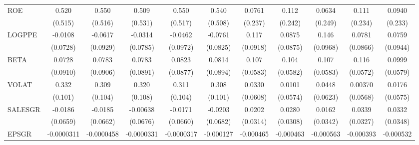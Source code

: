 \begin{table}[htbp]
\begin{tabular}{l*{10}{c}}
ROE             &    0.520         &    0.550         &    0.509         &    0.550         &    0.540         &   0.0761         &    0.112         &   0.0634         &    0.111         &   0.0940         \\
                &  (0.515)         &  (0.516)         &  (0.531)         &  (0.517)         &  (0.508)         &  (0.237)         &  (0.242)         &  (0.249)         &  (0.234)         &  (0.233)         \\
LOGPPE          &  -0.0108         &  -0.0617         &  -0.0314         &  -0.0462         &  -0.0761         &    0.117         &   0.0875         &    0.146         &   0.0781         &   0.0759         \\
                & (0.0728)         & (0.0929)         & (0.0785)         & (0.0972)         & (0.0825)         & (0.0918)         & (0.0875)         & (0.0968)         & (0.0866)         & (0.0944)         \\
BETA            &   0.0728         &   0.0783         &   0.0783         &   0.0823         &   0.0814         &    0.107\sym{*}  &    0.104\sym{*}  &    0.107\sym{*}  &    0.116\sym{**} &   0.0999\sym{*}  \\
                & (0.0910)         & (0.0906)         & (0.0891)         & (0.0877)         & (0.0894)         & (0.0583)         & (0.0582)         & (0.0583)         & (0.0572)         & (0.0579)         \\
VOLAT           &    0.332\sym{***}&    0.309\sym{***}&    0.320\sym{***}&    0.311\sym{***}&    0.308\sym{***}&   0.0330         &   0.0101         &   0.0448         &  0.00370         &   0.0176         \\
                &  (0.101)         &  (0.104)         &  (0.108)         &  (0.104)         &  (0.101)         & (0.0608)         & (0.0574)         & (0.0623)         & (0.0568)         & (0.0575)         \\
SALESGR         &  -0.0186         &  -0.0185         & -0.00638         &  -0.0171         &  -0.0203         &   0.0202         &   0.0280         &   0.0162         &   0.0339         &   0.0332         \\
                & (0.0659)         & (0.0662)         & (0.0676)         & (0.0660)         & (0.0682)         & (0.0314)         & (0.0308)         & (0.0342)         & (0.0327)         & (0.0348)         \\
EPSGR           &-0.0000311         &-0.0000458         &-0.0000331         &-0.0000317         &-0.000127         &-0.000465         &-0.000463         &-0.000563         &-0.000393         &-0.000532         \\

\end{tabular}
\end{table}
